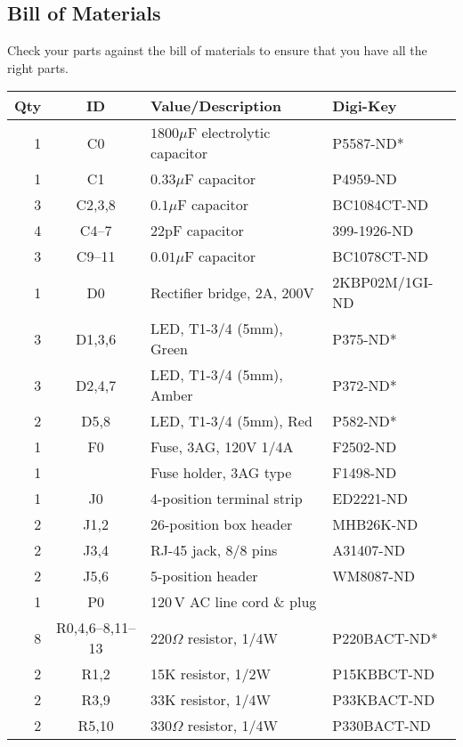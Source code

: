 \documentclass[12pt]{article}
\begin{document}
\subsection{Bill of Materials}
Check your parts against the bill of materials to ensure that you
have all the right parts.
 \begin{longtable}[c]{|r|c|p{2.25in}|l|}\hline
  \bf Qty & \bf ID     & \bf Value/Description & \bf Digi-Key\\\hline\hline
  \endhead
  1 & C0               & $1800\mu$F electrolytic capacitor & P5587-ND* \\\hline
  1 & C1               & $0.33\mu$F capacitor & P4959-ND\\\hline
  3 & C2,3,8           & $0.1\mu$F capacitor & BC1084CT-ND\\\hline
  4 & C4--7            & 22pF capacitor & 399-1926-ND\\\hline
  3 & C9--11           & $0.01\mu$F capacitor & BC1078CT-ND\\\hline
  1 & D0               & Rectifier bridge, 2A, 200V & 2KBP02M/1GI-ND\\\hline
  3 & D1,3,6           & LED, T1-3/4 (5mm), Green   & P375-ND* \\\hline
  3 & D2,4,7           & LED, T1-3/4 (5mm), Amber   & P372-ND* \\\hline
  2 & D5,8             & LED, T1-3/4 (5mm), Red     & P582-ND* \\\hline
  1 & F0               & Fuse, 3AG, 120V 1/4A       & F2502-ND \\\hline
  1 &                  & Fuse holder, 3AG type      & F1498-ND \\\hline
  1 & J0               & 4-position terminal strip  & ED2221-ND\\\hline
  2 & J1,2             & 26-position box header &  MHB26K-ND\\\hline
  2 & J3,4             & RJ-45 jack, 8/8 pins & A31407-ND\\\hline
  2 & J5,6             & 5-position header & WM8087-ND\\\hline
  1 & P0               & 120\,V AC line cord \& plug & \\\hline
  8 & R0,4,6--8,11--13 & $220\Omega$ resistor, 1/4W & P220BACT-ND*\\\hline
  2 & R1,2             & 15K resistor, 1/2W & P15KBBCT-ND\\\hline
  2 & R3,9             & 33K resistor, 1/4W & P33KBACT-ND\\\hline
  2 & R5,10            & $330\Omega$ resistor, 1/4W & P330BACT-ND\\\hline

\end{longtable}
\end{document}
